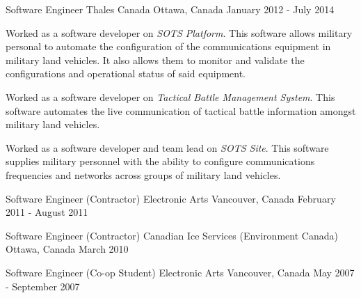 \begin{cventries}
\cventry
{Software Engineer} %
{Thales Canada} %
{Ottawa, Canada} %
{January 2012 - July 2014} %
{ %
\begin{cvitems}
\item {Worked as a software developer on \emph{SOTS Platform}. This software allows military personal to automate the configuration of the communications equipment in military land vehicles. It also allows them to monitor and validate the configurations and operational status of said equipment.}
\item {Worked as a software developer on \emph{Tactical Battle Management System}. This software automates the live communication of tactical battle information amongst military land vehicles.}
\item {Worked as a software developer and team lead on \emph{SOTS Site}. This software supplies military personnel with the ability to configure communications frequencies and networks across groups of military land vehicles.}
\end{cvitems} 
}


\cventry
{Software Engineer (Contractor)} %
{Electronic Arts} %
{Vancouver, Canada} %
{February 2011 - August 2011} %
{ %
\begin{cvitems}
\item {}
\end{cvitems}
}


\cventry
{Software Engineer (Contractor)} %
{Canadian Ice Services (Environment Canada)} %
{Ottawa, Canada} %
{March 2010} %
{ %
\begin{cvitems}
\item {}
\end{cvitems}
}


\cventry
{Software Engineer (Co-op Student)} %
{Electronic Arts} %
{Vancouver, Canada} %
{May 2007 - September 2007} %
{ %
\begin{cvitems}
\item {}
\end{cvitems}
}


\end{cventries}
